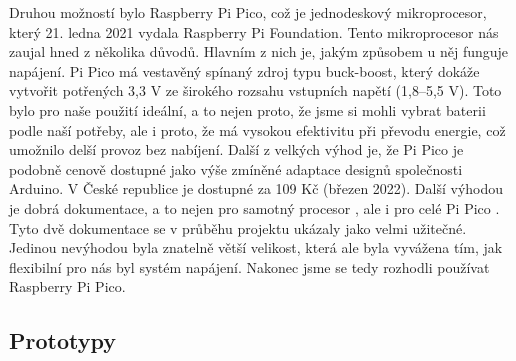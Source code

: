 \par Druhou možností bylo Raspberry Pi Pico, což je jednodeskový mikroprocesor, který 21. ledna 2021 vydala Raspberry Pi Foundation. Tento mikroprocesor nás zaujal hned z několika důvodů. Hlavním z nich je, jakým způsobem u něj funguje napájení. Pi Pico má vestavěný spínaný zdroj typu buck-boost, který dokáže vytvořit potřených 3,3 V ze širokého rozsahu vstupních napětí (1,8–5,5 V). Toto bylo pro naše použití ideální, a to nejen proto, že jsme si mohli vybrat baterii podle naší potřeby, ale i proto, že má vysokou efektivitu při převodu energie, což umožnilo delší provoz bez nabíjení. Další z velkých výhod je, že Pi Pico je podobně cenově dostupné jako výše zmíněné adaptace designů společnosti Arduino. V České republice je dostupné za 109 Kč (březen 2022). Další výhodou je dobrá dokumentace, a to nejen pro samotný procesor \citep{rp2040DS}, ale i pro celé Pi Pico \citep{picoDS}. Tyto dvě dokumentace se v průběhu projektu ukázaly jako velmi užitečné. Jedinou nevýhodou byla znatelně větší velikost, která ale byla vyvážena tím, jak flexibilní pro nás byl systém napájení. Nakonec jsme se tedy rozhodli používat Raspberry Pi Pico.
\subsection {Prototypy}
